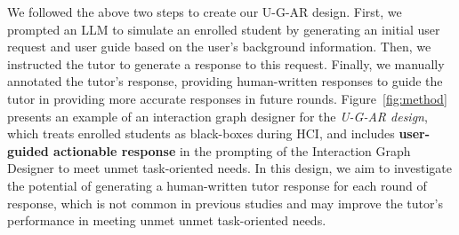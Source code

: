We followed the above two steps to create our U-G-AR design. First, we prompted an LLM to simulate an enrolled student by generating an initial user request and user guide based on the user's background information. Then, we instructed the tutor to generate a response to this request. Finally, we manually annotated the tutor's response, providing human-written responses to guide the tutor in providing more accurate responses in future rounds.
Figure~\ref{fig:method} presents an example of an interaction graph designer for the \textit{U-G-AR design}, which treats enrolled students as black-boxes during HCI, and includes \colorbox{methodcolor}{\textbf{user-guided actionable response}} in the prompting of the Interaction Graph Designer to meet unmet task-oriented needs. In this design, we aim to investigate the potential of generating a human-written tutor response for each round of response, which is not common in previous studies and may improve the tutor's performance in meeting unmet unmet task-oriented needs.
